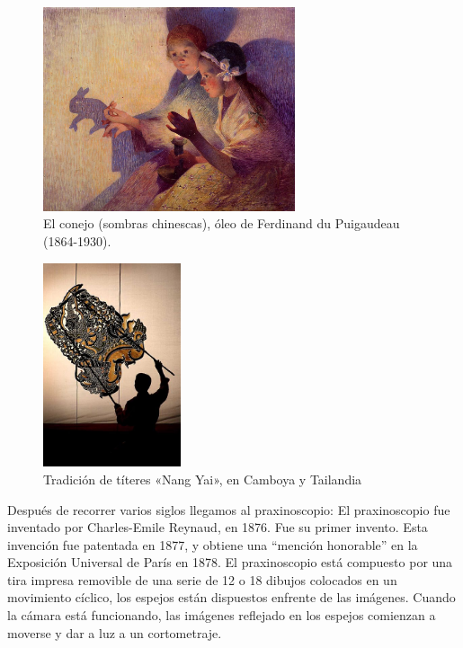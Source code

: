 \documentclass[a4paper,12pt]{report}
\begin{document}
 
\begin{figure}[ht]
\centering
\includegraphics[height=6cm]{Imagenes/Puigaudeau}
\caption{El conejo (sombras chinescas), óleo de Ferdinand du Puigaudeau (1864-1930).}
\label{fig:sombras_chinescas_fig}
\end{figure}
 
 
\begin{figure}[!ht]
\centering
\includegraphics[height=6cm]{Imagenes/Nang_Yai_puppet}
\caption{Tradición de títeres «Nang Yai», en Camboya y Tailandia}
\label{fig:Nang_Yai_puppet}
\end{figure}
 
\newpage
 
Después de recorrer varios siglos llegamos al praxinoscopio: El praxinoscopio fue inventado por Charles-Emile
Reynaud, en 1876. Fue su primer invento.
Esta invención fue patentada en
1877, y obtiene una ``mención
honorable'' en la Exposición
Universal de París en 1878.
El praxinoscopio está compuesto
por una tira impresa removible
de una serie de 12 o 18 dibujos
colocados en un movimiento
cíclico, los espejos están dispuestos enfrente de las
imágenes. Cuando la cámara está funcionando, las imágenes
reflejado en los espejos comienzan a moverse y
dar a luz a un cortometraje.\cite{praxinoscope}
 
\end{document}

